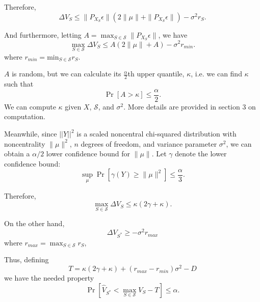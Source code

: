 \documentclass[12pt]{article}
\begin{document}
Therefore,
\[
\Delta V_S \leq \|P_{X_S} \epsilon\|(2 \|\mu\| + \|P_{X_S}\epsilon \|) - \sigma^2 r_S.
\]

And furthermore, letting $A = \max_{S \in \mathcal{S}} \|P_{X_S} \epsilon\|$,
we have
\[
\max_{S \in \mathcal{S}} \Delta V_S \leq A(2 \|\mu\| + A) - \sigma^2 r_{min}.
\]
where $r_{min} = \text{min}_{S \in \mathcal{S}} r_S$.

$A$ is random, but we can calculate its $\frac{\alpha}{2}$th upper quantile, $\kappa$, i.e. we can find $\kappa$ such that
\[
\Pr[A > \kappa] \leq \frac{\alpha}{2}.
\]
We can compute $\kappa$ given $X$, $\mathcal{S}$, and $\sigma^2$.  More details are provided in section 3 on computation.

Meanwhile, since $||Y||^2$ is a scaled noncentral chi-squared distribution with noncentrality $\|\mu\|^2$, $n$ degrees of freedom, and variance parameter $\sigma^2$, we can obtain a $\alpha/2$ lower confidence bound for $\|\mu\|$.  Let $\gamma$ denote the lower confidence bound:
\[
\sup_{\mu} \Pr[\gamma(Y) \geq \|\mu\|^2] \leq \frac{\alpha}{3}.
\]

Therefore,
\[
\max_{S \in \mathcal{S}} \Delta V_S \leq \kappa(2\gamma + \kappa).
\]

On the other hand,
\[
\Delta V_{S^*} \geq -\sigma^2 r_{max}
\]
where $r_{max} = \max_{S \in \mathcal{S}} r_S$,

Thus, defining
\[
T = \kappa(2\gamma + \kappa) + (r_{max}- r_{min}) \sigma^2 - D
\]
we have the needed property
\[
\Pr[\hat{V}_{S^*} < \max_{S \in \mathcal{S}} V_S - T] \leq \alpha.
\]
\end{document}
